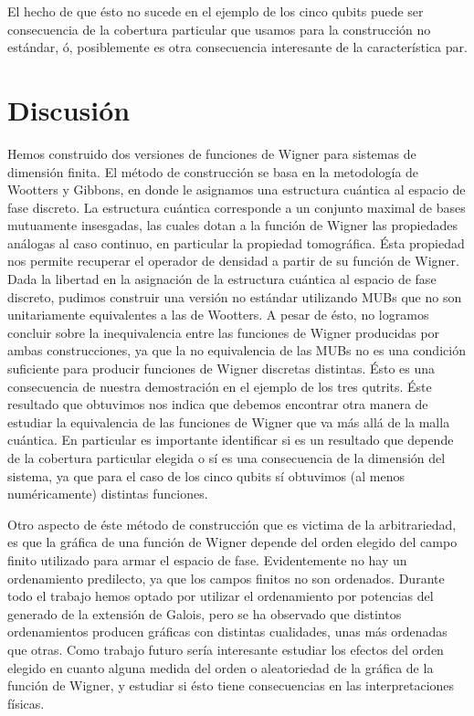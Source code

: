 \documentclass[a4paper,11pt]{report}
\begin{document}
  El hecho de que ésto no sucede en el ejemplo de los cinco
  qubits puede ser consecuencia de la cobertura particular
  que usamos para la construcción no estándar, ó,
  posiblemente es otra consecuencia interesante de la
  característica par. 

  \clearpage
  \section{Discusión}

  Hemos construido dos versiones de funciones de Wigner para
  sistemas de dimensión finita. El método de construcción se
  basa en la metodología de Wootters y Gibbons, en donde le
  asignamos una estructura cuántica al espacio de fase
  discreto. La estructura cuántica corresponde a un conjunto
  maximal de bases mutuamente insesgadas, las cuales dotan a
  la función de Wigner las propiedades análogas al caso
  continuo, en particular la propiedad tomográfica.
  Ésta propiedad nos permite recuperar el operador de
  densidad a partir de su función de Wigner. Dada la
  libertad en la asignación de la estructura cuántica al
  espacio de fase discreto, pudimos construir una versión no
  estándar utilizando MUBs que no son unitariamente
  equivalentes a las de Wootters. A pesar de ésto, no
  logramos concluir sobre la inequivalencia entre las
  funciones de Wigner producidas por ambas construcciones,
  ya que la no equivalencia de las MUBs no es una condición
  suficiente para producir funciones de Wigner discretas
  distintas. Ésto es una consecuencia de nuestra
  demostración en el ejemplo de los tres qutrits. Éste
  resultado que obtuvimos nos indica que debemos encontrar
  otra manera de estudiar la equivalencia de las funciones
  de Wigner que va más allá de la malla cuántica. En
  particular es importante identificar si es un resultado
  que depende de la cobertura particular elegida o sí es una
  consecuencia de la dimensión del sistema, ya que para el
  caso de los cinco qubits sí obtuvimos (al menos
  numéricamente) distintas funciones.

  Otro aspecto de éste método de construcción que es victima
  de la arbitrariedad, es que la gráfica de una función de
  Wigner depende del orden elegido del campo finito
  utilizado para armar el espacio de fase. Evidentemente no
  hay un ordenamiento predilecto, ya que los campos finitos
  no son ordenados.  Durante todo el trabajo hemos optado
  por utilizar el ordenamiento por potencias del generado de
  la extensión de Galois, pero se ha observado que distintos
  ordenamientos producen gráficas con distintas cualidades,
  unas más ordenadas que otras. Como trabajo futuro sería
  interesante estudiar los efectos del orden elegido en
  cuanto alguna medida del orden o aleatoriedad de la
  gráfica de la función de Wigner, y estudiar si ésto tiene
  consecuencias en las interpretaciones físicas.
\end{document}
